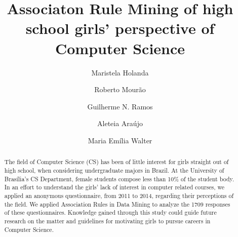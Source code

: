 \documentclass{llncs}
\begin{document}
%
\title{Associaton Rule Mining of high school girls' perspective of Computer Science}%
%
\author{Maristela Holanda%
\and Roberto Mourão
\and Guilherme N. Ramos%
\and Aleteia Araújo
\and Maria Emília Walter}%
%
%

\maketitle%

\begin{abstract}%
The field of Computer Science (CS) has been of little interest for girls straight out of high school, when considering undergraduate majors in Brazil. At the University of Brasília’s CS Department, female students compose less than 10\% of the student body. In an effort to understand the girls’ lack of interest in computer related courses, we applied an anonymous questionnaire, from 2011 to 2014, regarding their perceptions of the field. We applied Association Rules in Data Mining to analyze the 1709 responses of these questionnaires. Knowledge gained through this study could guide future research on the matter and guidelines for motivating girls to pursue careers in Computer Science.


%
\end{abstract}%

%
%
%
%
%

%
%
\end{document}
